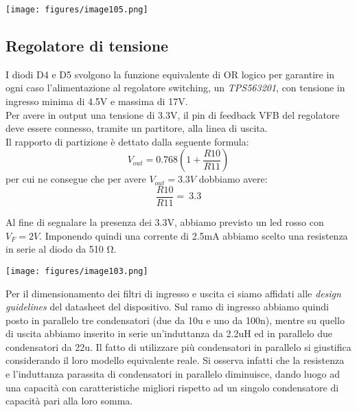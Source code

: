 \begin{center}
\texttt{[image: figures/image105.png]}
\captionsetup{type=figure}
\end{center}

\hypertarget{regolatore-di-tensione}{%
\subsection{\texorpdfstring{Regolatore di tensione}{Regolatore di tensione}}\label{regolatore-di-tensione}}

I diodi D4 e D5 svolgono la funzione equivalente di OR logico per garantire in ogni caso l’alimentazione al regolatore switching,
un \emph{TPS563201}, con tensione in ingresso minima di 4.5V e massima di 17V.\\
Per avere in output una tensione di 3.3V, il pin di feedback VFB del regolatore deve essere connesso, tramite un partitore, alla linea di uscita.\\
Il rapporto di partizione è dettato dalla seguente formula:\\
\[V_{out} = 0.768(1 + \frac{R10}{R11})\]
per cui ne consegue che per avere $V_{out}=3.3V$ dobbiamo avere:\\
\[\frac{R10}{R11} = \ 3.3\]

Al fine di segnalare la presenza dei 3.3V, abbiamo previsto un led rosso con $V_F=2V$.
Imponendo quindi una corrente di 2.5mA abbiamo scelto una resistenza in serie al diodo da 510 Ω.

\begin{center}
\texttt{[image: figures/image103.png]}
\captionsetup{type=figure}
\end{center}
      
\noindent Per il dimensionamento dei filtri di ingresso e uscita ci siamo affidati alle \textit{design guidelines} del datasheet del dispositivo. Sul ramo di ingresso abbiamo quindi posto in parallelo tre condensatori (due da 10u e uno da 100n), mentre su quello di uscita abbiamo inserito in serie un’induttanza da 2.2uH ed in parallelo due condensatori da 22u. Il fatto di utilizzare più condensatori in parallelo si giustifica considerando il loro modello equivalente reale. Si osserva infatti che la resistenza e l’induttanza parassita di condensatori in parallelo diminuisce, dando luogo ad una capacità con caratteristiche migliori rispetto ad un singolo condensatore di capacità pari alla loro somma.


